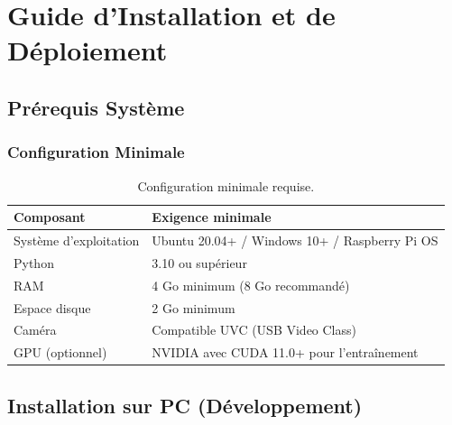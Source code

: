 
\chapter{Guide d'Installation et de Déploiement}

\section{Prérequis Système}

\subsection{Configuration Minimale}

\begin{table}[H]
\centering
\caption{Configuration minimale requise.}
\renewcommand{\arraystretch}{1.3}
\begin{tabular}{|l|l|}
\hline
\rowcolor{stellantisblue!15}
\textbf{Composant} & \textbf{Exigence minimale} \\
\hline
Système d'exploitation & Ubuntu 20.04+ / Windows 10+ / Raspberry Pi OS \\
\hline
Python & 3.10 ou supérieur \\
\hline
RAM & 4 Go minimum (8 Go recommandé) \\
\hline
Espace disque & 2 Go minimum \\
\hline
Caméra & Compatible UVC (USB Video Class) \\
\hline
GPU (optionnel) & NVIDIA avec CUDA 11.0+ pour l'entraînement \\
\hline
\end{tabular}
\end{table}

\section{Installation sur PC (Développement)}

